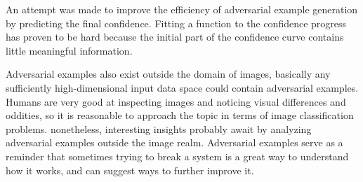 \documentclass[11pt, a4paper]{article}
\begin{document}
An attempt was made to improve the efficiency of adversarial example generation by predicting the final confidence. Fitting a function to the confidence progress has proven to be hard because the initial part of the confidence curve contains little meaningful information.

Adversarial examples also exist outside the domain of images, basically any sufficiently high-dimensional input data space could contain adversarial examples. Humans are very good at inspecting images and noticing visual differences and oddities, so it is reasonable to approach the topic in terms of image classification problems. nonetheless, interesting insights probably await by analyzing adversarial examples outside the image realm. Adversarial examples serve as a reminder that sometimes trying to break a system is a great way to understand how it works, and can suggest ways to further improve it.

\end{document}

